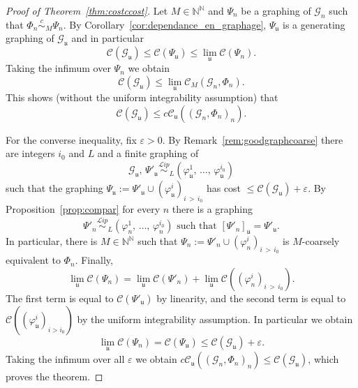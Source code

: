 \documentclass[10pt]{amsart}
\theoremstyle{definition}
\newcommand{\Nmath}{\mathbb{N}}
\newcommand{\cost}{\mathcal{C}}
\newcommand{\ccost}{c\mathcal{C}}
\newcommand{\cg}{\mathcal{G}}
\newcommand{\ul}{\mathfrak{u}}
\newcommand{\eps}{\varepsilon}
\newcommand{\ph}{\varphi}
\newcommand\Lipeq{\overset{\mathcal{L}ip}{\sim}}
\newcommand\ceq{\overset{c}{\sim}}
\begin{document}
\begin{proof}[Proof of Theorem~\ref{thm:costccost}] Let $M \in \Nmath^\Nmath$ and $\Psi_n$ be a graphing of $\cg_n$ such that $\Phi_n \ceq_M \Psi_n$. By Corollary~\ref{cor:dependance_en_graphage}, $\Psi_\ul$ is a generating graphing of $\cg_\ul$ and in particular
\[
\cost(\cg_\ul) \leq \cost(\Psi_\ul) \leq \lim_\ul \cost(\Psi_n).
\]
Taking the infimum over $\Psi_n$ we obtain
\[
\cost(\cg_\ul) \leq \lim_\ul \cost_M(\cg_n,\Phi_n).
\]
This shows (without the uniform integrability assumption) that
\[
\cost(\cg_\ul) \leq \ccost_\ul((\cg_n,\Phi_n)_n).
\]

For the converse inequality, fix $\eps>0$. By Remark~\ref{rem:goodgraphcoarse} there are integers $i_0$ and $L$ and a finite graphing of
\[
\cg_\ul,\,\Psi'_\ul \Lipeq_L \left(\ph_\ul^1,\,\dots,\,\ph_\ul^{i_0}\right)
\]
such that the graphing $\Psi_\ul :=\Psi'_\ul \cup (\ph_\ul^i)_{i\,>\,i_0}$ has cost $\leq \cost(\cg_\ul)+\varepsilon$. By Proposition~\ref{prop:compar} for every $n$ there is a graphing
\[
\Psi'_n\Lipeq_L \left(\ph_n^1,\,\dots,\,\ph_n^{i_0}\right)\text{ such that }\left[\Psi'_n\right]_\ul =\Psi'_\ul.
\]
In particular, there is $M \in \Nmath^\Nmath$ such that $\Psi_n := \Psi'_n \cup (\ph_n^i)_{i\,>\,i_0}$ is $M$-coarsely equivalent to $\Phi_n$. Finally,
\[
\lim_\ul \cost(\Psi_n) = \lim_\ul \cost(\Psi'_n) + \lim_\ul \cost\left(\left(\ph_n^i\right)_{i\,>\,i_0}\right).
\]
The first term is equal to $\cost(\Psi'_\ul)$ by linearity, and the second term is equal to $\cost((\ph_\ul^i)_{i>i_0})$ by the uniform integrability assumption. In particular we obtain
\[
\lim_\ul \cost(\Psi_n) = \cost(\Psi_\ul) \leq \cost(\cg_\ul)+\eps.
\]
Taking the infimum over all $\eps$ we obtain $\ccost_\ul((\cg_n,\Phi_n)_n) \leq \cost(\cg_\ul)$, which proves the theorem.
\end{proof}
\end{document}
